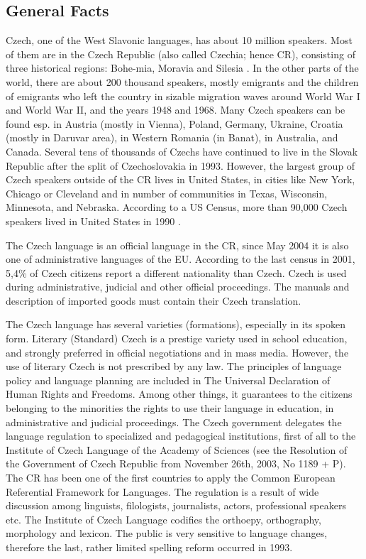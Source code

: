 \begin{multicols}{2}

\subsection{General Facts}

Czech, one of the West Slavonic languages, has about 10 million speakers. Most of them are in the Czech Republic (also called Czechia; hence CR), consisting of three historical regions: Bohe-mia, Moravia and Silesia \cite{Note1_en}. In the other parts of the world, there are about 200 thousand speakers, mostly emigrants and the children of emigrants who left the country in sizable migration waves around World War I and World War II, and the years 1948 and 1968. Many Czech speakers can be found esp. in Austria (mostly in Vienna), Poland, Germany, Ukraine, Croatia (mostly in Daruvar area), in Western Romania (in Banat), in Australia, and Canada. Several tens of thousands of Czechs have continued to live in the Slovak Republic after the split of Czechoslovakia in 1993. However, the largest group of Czech speakers outside of the CR lives in United States, in cities like New York, Chicago or Cleveland and in number of communities in Texas, Wisconsin, Minnesota, and Nebraska. According to a US Census, more than 90,000 Czech speakers lived in United States in 1990 \cite{Note2}.

The Czech language is an official language in the CR, since May 2004 it is also one of administrative languages of the EU. According to the last census in 2001, 5,4\% of Czech citizens report a different nationality than Czech. Czech is used during administrative, judicial and other official proceedings. The manuals and description of imported goods must contain their Czech translation.

The Czech language has several varieties (formations), especially in its spoken form. Literary (Standard) Czech is a prestige variety used in school education, and strongly preferred in official negotiations and in mass media. However, the use of literary Czech is not prescribed by any law. The principles of language policy and language planning are included in The Universal Declaration of Human Rights and Freedoms. Among other things, it guarantees to the citizens belonging to the minorities the rights to use their language in education, in administrative and judicial proceedings. The Czech government delegates the language regulation to specialized and pedagogical institutions, first of all to the Institute of Czech Language of the Academy of Sciences (see the Resolution of the Government of Czech Republic from November 26th, 2003, No 1189 + P). The CR has been one of the first countries to apply the Common European Referential Framework for Languages. The regulation is a result of wide discussion among linguists, filologists, journalists, actors, professional speakers etc. The Institute of Czech Language codifies the orthoepy, orthography, morphology and lexicon. The public is very sensitive to language changes, therefore the last, rather limited spelling reform occurred in 1993.


\end{multicols}

